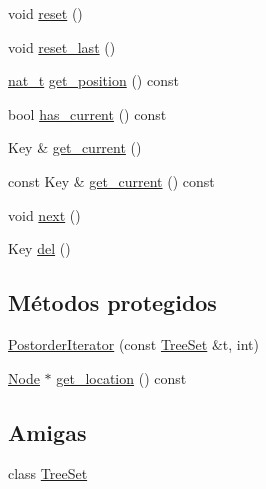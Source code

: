 \begin{DoxyCompactItemize}
void \hyperlink{class_designar_1_1_tree_set_1_1_postorder_iterator_a776630cf833ad659523ef4ca99c06553}{reset} ()
\item 
void \hyperlink{class_designar_1_1_tree_set_1_1_postorder_iterator_a857b3dcc1e25a235f72d0208cdd362a4}{reset\+\_\+last} ()
\item 
\hyperlink{namespace_designar_aa72662848b9f4815e7bf31a7cf3e33d1}{nat\+\_\+t} \hyperlink{class_designar_1_1_tree_set_1_1_postorder_iterator_a09170166eaa3f2dfa50975ea14d99270}{get\+\_\+position} () const
\item 
bool \hyperlink{class_designar_1_1_tree_set_1_1_postorder_iterator_a550cba5f162afa8ff251d750b6147f3c}{has\+\_\+current} () const
\item 
Key \& \hyperlink{class_designar_1_1_tree_set_1_1_postorder_iterator_aac01442bfcab349c1f427f480ff35c38}{get\+\_\+current} ()
\item 
const Key \& \hyperlink{class_designar_1_1_tree_set_1_1_postorder_iterator_aa2d9802b08ed7377213619ae8fa90bc5}{get\+\_\+current} () const
\item 
void \hyperlink{class_designar_1_1_tree_set_1_1_postorder_iterator_a5dc00bc0f67733886839372bce6870e5}{next} ()
\item 
Key \hyperlink{class_designar_1_1_tree_set_1_1_postorder_iterator_aec3466cdaf68ffa2026de3bf5033fefc}{del} ()
\end{DoxyCompactItemize}
\subsection*{Métodos protegidos}
\begin{DoxyCompactItemize}
\item 
\hyperlink{class_designar_1_1_tree_set_1_1_postorder_iterator_ab562263cb488221eb2cfc53b9785a0e6}{Postorder\+Iterator} (const \hyperlink{class_designar_1_1_tree_set}{Tree\+Set} \&t, int)
\item 
\hyperlink{class_designar_1_1_tree_set_a7409a9c1545c0e9e2fd6b84120713c99}{Node} $\ast$ \hyperlink{class_designar_1_1_tree_set_1_1_postorder_iterator_abd9ef4eeb3e56c101dbf32b15253b56e}{get\+\_\+location} () const
\end{DoxyCompactItemize}
\subsection*{Amigas}
\begin{DoxyCompactItemize}
\item 
class \hyperlink{class_designar_1_1_tree_set_1_1_postorder_iterator_a7caa42294700d2a60905ec3458a7cd8a}{Tree\+Set}
\end{DoxyCompactItemize}


